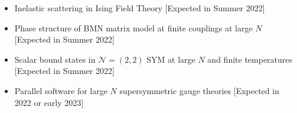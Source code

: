 \renewcommand{\arraystretch}{1.1}

	\begin{itemize} 
	 \item Inelastic scattering in Ising Field Theory [Expected in Summer 2022] 
	 \item Phase structure of BMN matrix model at finite couplings at large $N$ [Expected in Summer 2022] 
	 \item Scalar bound states in $\mathcal{N}=(2,2)$ SYM at large $N$ and finite temperatures [Expected in Summer 2022] 
	 \item Parallel software for large $N$ supersymmetric gauge theories [Expected in 2022 or early 2023] 
	 \end{itemize}
